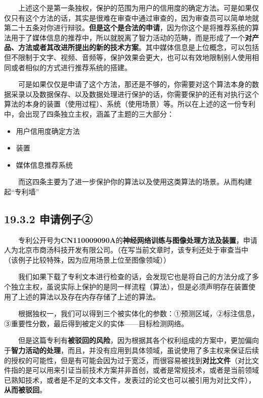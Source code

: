   上述这个是第一条独权，保护的范围为用户的信用度的确定方法。可是如果仅仅只有这个方法的话，其实是很难在审查中通过审查的，因为审查员可以简单地就第二十五条对你进行辩驳。\textbf{但是这个是合法的申请}，因为你这个是将推荐系统的算法用于了媒体信息的推荐中，所以就脱离了智力活动的范畴，而是形成了一个\textbf{对产品、方法或者其改进所提出的新的技术方案}。其中媒体信息是上位概念，可以包括但不限制于文字、视频、音频等，保护效果会更大，也可以有效地限制别人使用相同或者相似的方式进行推荐系统的搭建。

  可是如果仅仅是申请了这个方法，那还是不够的，你需要对这个算法本身的数据采录以及数据保存、以及数据处理进行保护的话，你需要保护的还有对执行这个算法的本身的装置（使用过程）、系统（使用场景）等。所以在上述的这一份专利中，会出现了四条独立主权，涵盖了主题的三大部分：

\begin{itemize}
\item
  用户信用度确定方法
\item
  装置
\item
  媒体信息推荐系统
\end{itemize}

  而这四条主要为了进一步保护你的算法以及使用这类算法的场景。从而构建起``专利墙''

\subsection{19.3.2 申请例子②}\label{ux7533ux8bf7ux4f8bux5b50-1}

  专利公开号为\textbf{CN110009090A}的\textbf{神经网络训练与图像处理方法及装置}，申请人为北京市商汤科技开发有限公司。（在写当前文章时，该专利还处于审查当中（该例子比较特殊，因为应用场景上位至图像领域））

  我们如果下载了专利文本进行检查的话，会发现它也是将自己的方法分成了多个独立主权，虽说实际上保护的是同一样流程（算法），但是必须声明存在装置使用了上述的算法以及存在内存存储了上述的算法。

  根据独权一，我们可以得到三个被实体化的参数：①预测区域，②标注信息，③重要性分数，最后得到被定义的实体------目标检测网络。

  但是这篇专利有\textbf{被驳回的风险}，因为根据其各个权利组成的方案中，更加偏向于\textbf{智力活动的处理}，而且，并没有应用到具体领域，虽说使用了多主权来保证后续的授权的可能性，但是有可能会因为过于宽泛，而很容易被找到\textbf{对比文件}（对比文件指的是可以用来引证当前技术方案并非首创，或者是常规技术，或者是当前领域已熟知技术，或者是不足的文本文件，发表过的论文也可以被引用为对比文件），\textbf{从而被驳回}。

